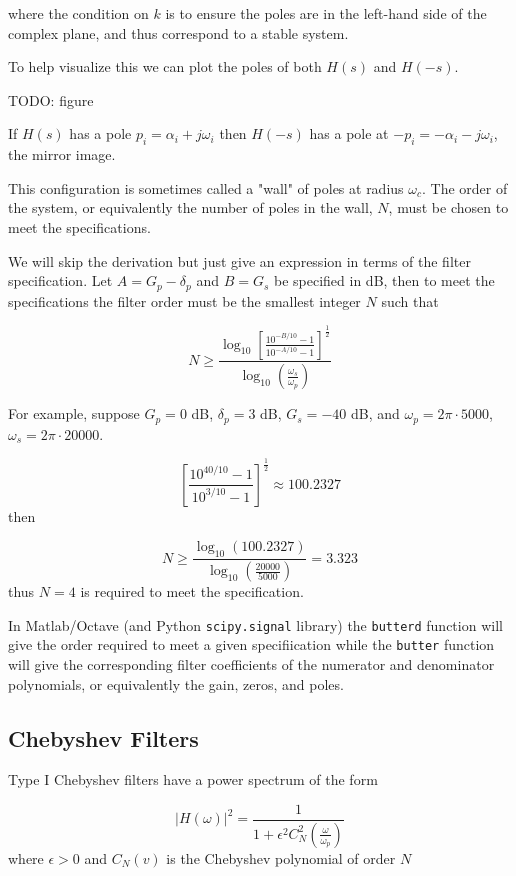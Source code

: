 \documentclass{article}
\begin{document}
where the condition on $k$ is to ensure the poles are in the left-hand side of the complex plane, and thus correspond to a stable system.

To help visualize this we can plot the poles of both $H(s)$ and $H(-s)$.

TODO: figure

If $H(s)$ has a pole $p_i = \alpha_i + j\omega_i$ then $H(-s)$ has a pole at $-p_i = -\alpha_i - j\omega_i$, the mirror image.

This configuration is sometimes called a "wall" of poles at radius $\omega_c$. The order of the system, or equivalently the number of poles in the wall, $N$, must be chosen to meet the specifications.

We will skip the derivation but just give an expression in terms of the filter specification. Let $A = G_p - \delta_p$ and $B=G_s$ be specified in dB, then to meet the specifications the filter order must be the smallest integer $N$ such that

\[
N \geq \frac{\log_{10}\left[ \frac{10^{-B/10}-1}{10^{-A/10}-1} \right]^{\frac{1}{2}}}{\log_{10}\left( \frac{\omega_s}{\omega_p}\right)}
\]

For example, suppose $G_p = 0$ dB, $\delta_p = 3$ dB, $G_s = -40$ dB, and $\omega_p = 2\pi\cdot 5000$, $\omega_s = 2\pi\cdot 20 000$.

\[
\left[ \frac{10^{40/10}-1}{10^{3/10}-1} \right]^{\frac{1}{2}} \approx 100.2327
\]
then

\[
N \geq \frac{\log_{10}(100.2327)}{\log_{10}\left( \frac{20000}{5000}\right)} = 3.323
\]
thus $N = 4$ is required to meet the specification.

In Matlab/Octave (and Python \texttt{scipy.signal} library) the \texttt{butterd} function will give the order required to meet a given specifiication while the \texttt{butter} function will give the corresponding filter coefficients of the numerator and denominator polynomials, or equivalently the gain, zeros, and poles.

\subsection{Chebyshev Filters}

Type I Chebyshev filters have a power spectrum of the form

\[
\left| H(\omega) \right|^2 = \frac{1}{1 + \epsilon^2C_N^2\left( \frac{\omega}{\omega_p}\right)}
\]
where $\epsilon > 0$ and $C_N(v)$ is the Chebyshev polynomial of order $N$
\end{document}
